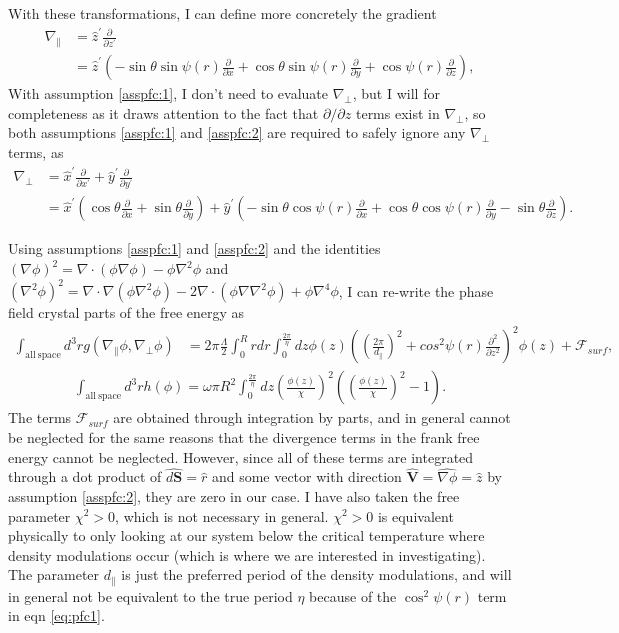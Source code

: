 \documentclass[12pt]{article}
\begin{document}
With these transformations, I can define more concretely the gradient
\begin{align}
\nabla_{\parallel}&=\hat{z}^{\prime}\frac{\partial}{\partial z^{\prime}}\nonumber\\
&=\hat{z}^{\prime}\left(-\sin\theta\sin\psi(r)\frac{\partial}{\partial x}+\cos\theta\sin\psi(r)\frac{\partial}{\partial y}+\cos\psi(r)\frac{\partial}{\partial z}\right),
\end{align}
With assumption \ref{asspfc:1}, I don't need to evaluate $\nabla_{\bot}$, but I will for completeness as it draws attention to the fact that $\partial/\partial z$ terms exist in $\nabla_{\bot}$, so both assumptions \ref{asspfc:1} and \ref{asspfc:2} are required to safely ignore any $\nabla_{\bot}$ terms, as
\begin{align}
\nabla_{\bot}&=\hat{x}^{\prime}\frac{\partial}{\partial x^{\prime}}+\hat{y}^{\prime}\frac{\partial}{\partial y^{\prime}}\nonumber\\
&=\hat{x}^{\prime}\left(\cos\theta\frac{\partial}{\partial x}+\sin\theta\frac{\partial}{\partial y}\right)+\hat{y}^{\prime}\left(-\sin\theta\cos\psi(r)\frac{\partial}{\partial x}+\cos\theta\cos\psi(r)\frac{\partial}{\partial y}-\sin\theta\frac{\partial}{\partial z}\right).
\end{align}

Using assumptions \ref{asspfc:1} and \ref{asspfc:2} and the identities $(\nabla\phi)^2=\nabla\cdot(\phi\nabla\phi)-\phi\nabla^2\phi$ and $(\nabla^2\phi)^2=\nabla\cdot\nabla(\phi\nabla^2\phi)-2\nabla\cdot(\phi\nabla\nabla^2\phi)+\phi\nabla^4\phi$, I can re-write the phase field crystal parts of the free energy as
\begin{align}\label{eq:pfc1}
\int_{\mathrm{all\:space}}d^3rg(\nabla_{\parallel}\phi,\nabla_{\bot}\phi)&=2\pi\frac{\Lambda}{2}\int_0^Rrdr\int_0^{\frac{2\pi}{\eta}}dz\phi(z)\left(\left(\frac{2\pi}{d_{\parallel}}\right)^2+cos^2\psi(r)\frac{\partial^2}{\partial z^2}\right)^2\phi(z)+\mathcal{F}_{surf},
\end{align}
\begin{align}
\int_{\mathrm{all\:space}}d^3rh(\phi)=\omega\pi R^2\int_0^{\frac{2\pi}{\eta}}dz\left(\frac{\phi(z)}{\chi}\right)^2\left(\left(\frac{\phi(z)}{\chi}\right)^2-1\right).
\end{align}
The terms $\mathcal{F}_{surf}$ are obtained through integration by parts, and in general cannot be neglected for the same reasons that the divergence terms in the frank free energy cannot be neglected. However, since all of these terms are integrated through a dot product of $\hat{d\bm{S}}=\hat{r}$ and some vector with direction $\hat{\bm{V}}=\hat{\nabla\phi}=\hat{z}$ by assumption \ref{asspfc:2}, they are zero in our case. I have also taken the free parameter $\chi^2>0$, which is not necessary in general. $\chi^2>0$ is equivalent physically to only looking at our system below the critical temperature where density modulations occur (which is where we are interested in investigating). The parameter $d_{\parallel}$ is just the preferred period of the density modulations, and will in general not be equivalent to the true period $\eta$ because of the $\cos^2\psi(r)$ term in eqn \ref{eq:pfc1}.
\end{document}

